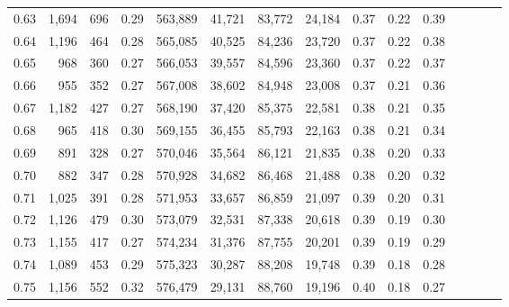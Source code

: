 \begin{tabular}{rrrcrrrrrrrrrrr}
0.63 &   1,694 &    696 &                                       0.29 &  563,889 &   41,721 &   83,772 &   24,184 &  0.37 &  0.22 &                         0.39 \\
0.64 &   1,196 &    464 &                                       0.28 &  565,085 &   40,525 &   84,236 &   23,720 &  0.37 &  0.22 &                         0.38 \\
0.65 &     968 &    360 &                                       0.27 &  566,053 &   39,557 &   84,596 &   23,360 &  0.37 &  0.22 &                         0.37 \\
0.66 &     955 &    352 &                                       0.27 &  567,008 &   38,602 &   84,948 &   23,008 &  0.37 &  0.21 &                         0.36 \\
0.67 &   1,182 &    427 &                                       0.27 &  568,190 &   37,420 &   85,375 &   22,581 &  0.38 &  0.21 &                         0.35 \\
0.68 &     965 &    418 &                                       0.30 &  569,155 &   36,455 &   85,793 &   22,163 &  0.38 &  0.21 &                         0.34 \\
0.69 &     891 &    328 &                                       0.27 &  570,046 &   35,564 &   86,121 &   21,835 &  0.38 &  0.20 &                         0.33 \\
0.70 &     882 &    347 &                                       0.28 &  570,928 &   34,682 &   86,468 &   21,488 &  0.38 &  0.20 &                         0.32 \\
0.71 &   1,025 &    391 &                                       0.28 &  571,953 &   33,657 &   86,859 &   21,097 &  0.39 &  0.20 &                         0.31 \\
0.72 &   1,126 &    479 &                                       0.30 &  573,079 &   32,531 &   87,338 &   20,618 &  0.39 &  0.19 &                         0.30 \\
0.73 &   1,155 &    417 &                                       0.27 &  574,234 &   31,376 &   87,755 &   20,201 &  0.39 &  0.19 &                         0.29 \\
0.74 &   1,089 &    453 &                                       0.29 &  575,323 &   30,287 &   88,208 &   19,748 &  0.39 &  0.18 &                         0.28 \\
0.75 &   1,156 &    552 &                                       0.32 &  576,479 &   29,131 &   88,760 &   19,196 &  0.40 &  0.18 &                         0.27 \\

\end{tabular}
